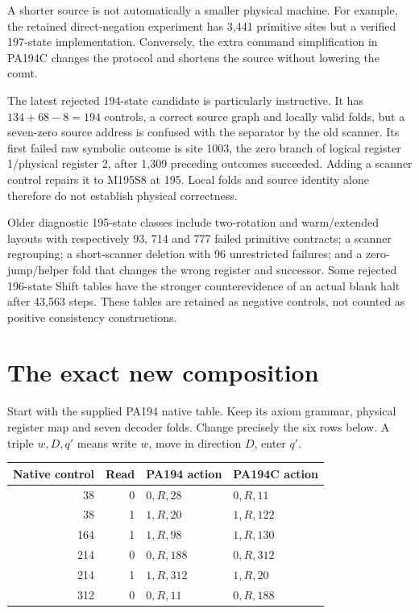 \documentclass[11pt,letterpaper]{article}
\begin{document}
A shorter source is not automatically a smaller physical machine. For example,
the retained direct-negation experiment has 3,441 primitive sites but a verified
197-state implementation. Conversely, the extra command simplification in
PA194C changes the protocol and shortens the source without lowering the count.

The latest rejected 194-state candidate is particularly instructive. It has
$134+68-8=194$ controls, a correct source graph and locally valid folds, but a
seven-zero source address is confused with the separator by the old scanner.
Its first failed raw symbolic outcome is site 1003, the zero branch of logical
register 1/physical register 2, after 1,309 preceding outcomes succeeded.
Adding a scanner control repairs it to M195S8 at 195. Local folds and source
identity alone therefore do not establish physical correctness.

Older diagnostic 195-state classes include two-rotation and warm/extended
layouts with respectively 93, 714 and 777 failed primitive contracts; a scanner
regrouping; a short-scanner deletion with 96 unrestricted failures; and a
zero-jump/helper fold that changes the wrong register and successor. Some
rejected 196-state Shift tables have the stronger counterevidence of an actual
blank halt after 43,563 steps. These tables are retained as negative controls,
not counted as positive consistency constructions.

\section{The exact new composition}
\label{sec:construction}

Start with the supplied PA194 native table. Keep its axiom grammar, physical
register map and seven decoder folds. Change precisely the six rows below.
A triple $w,D,q'$ means write $w$, move in direction $D$, enter $q'$.

\begin{center}
\begin{tabular}{@{}rrll@{}}
\toprule
Native control & Read & PA194 action & PA194C action\\
\midrule
38&0&$0,R,28$&$0,R,11$\\
38&1&$1,R,20$&$1,R,122$\\
164&1&$1,R,98$&$1,R,130$\\
214&0&$0,R,188$&$0,R,312$\\
214&1&$1,R,312$&$1,R,20$\\
312&0&$0,R,11$&$0,R,188$\\
\bottomrule
\end{tabular}
\end{center}
\end{document}
